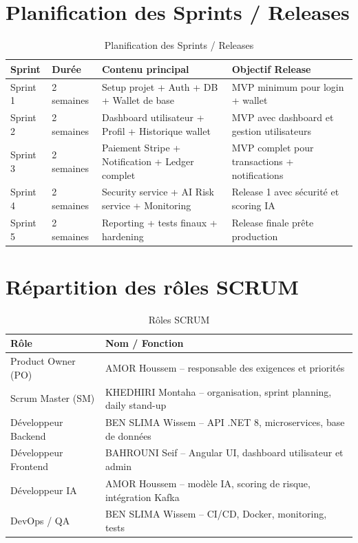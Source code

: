 \documentclass[12pt,a4paper]{report}
\begin{document}
\section{Planification des Sprints / Releases}
\begin{table}[H]
\centering
\begin{tabular}{|p{2cm}|p{2cm}|p{7cm}|p{4cm}|}
\hline
\textbf{Sprint} & \textbf{Durée} & \textbf{Contenu principal} & \textbf{Objectif Release} \\
\hline
Sprint 1 & 2 semaines & Setup projet + Auth + DB + Wallet de base & MVP minimum pour login + wallet \\
\hline
Sprint 2 & 2 semaines & Dashboard utilisateur + Profil + Historique wallet & MVP avec dashboard et gestion utilisateurs \\
\hline
Sprint 3 & 2 semaines & Paiement Stripe + Notification + Ledger complet & MVP complet pour transactions + notifications \\
\hline
Sprint 4 & 2 semaines & Security service + AI Risk service + Monitoring & Release 1 avec sécurité et scoring IA \\
\hline
Sprint 5 & 2 semaines & Reporting + tests finaux + hardening & Release finale prête production \\
\hline
\end{tabular}
\caption{Planification des Sprints / Releases}
\end{table}

\section{Répartition des rôles SCRUM}
\begin{table}[H]
\centering
\begin{tabular}{|p{4cm}|p{9cm}|}
\hline
\textbf{Rôle} & \textbf{Nom / Fonction} \\
\hline
Product Owner (PO) & AMOR Houssem -- responsable des exigences et priorités \\
Scrum Master (SM) & KHEDHIRI Montaha -- organisation, sprint planning, daily stand-up \\
Développeur Backend & BEN SLIMA Wissem -- API .NET 8, microservices, base de données \\
Développeur Frontend & BAHROUNI Seif -- Angular UI, dashboard utilisateur et admin \\
Développeur IA & AMOR Houssem -- modèle IA, scoring de risque, intégration Kafka \\
DevOps / QA & BEN SLIMA Wissem -- CI/CD, Docker, monitoring, tests \\
\hline
\end{tabular}
\caption{Rôles SCRUM}
\end{table}
\end{document}
